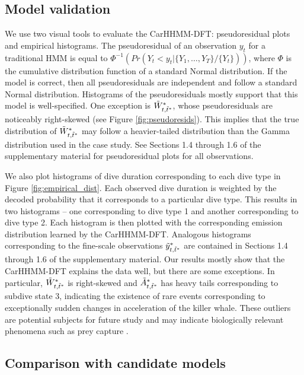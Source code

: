 \subsection{Model validation}
\label{subsec:model_validation}

We use two visual tools to evaluate the CarHHMM-DFT: pseudoresidual plots and empirical histograms. The pseudoresidual of an observation $y_t$ for a traditional HMM is equal to $\Phi^{-1} \left(Pr(Y_t < y_t|\{Y_1,\ldots,Y_T\}/\{Y_t\}) \right)$, where $\Phi$ is the cumulative distribution function of a standard Normal distribution. If the model is correct, then all pseudoresiduals are independent and follow a standard Normal distribution. Histograms of the pseudoresiduals mostly support that this model is well-specified. One exception is $\tilde{W}^*_{t,\tilde t^*}$, whose pseudoresiduals are noticeably right-skewed (see Figure \ref{fig:pseudoresids}). This implies that the true distribution of $\tilde{W}^*_{t,\tilde t^*}$ may follow a heavier-tailed distribution than the Gamma distribution used in the case study. See Sections 1.4 through 1.6 of the supplementary material for pseudoresidual plots for all observations.

We also plot histograms of dive duration corresponding to each dive type in Figure \ref{fig:empirical_dist}. Each observed dive duration is weighted by the decoded probability that it corresponds to a particular dive type. This results in two histograms -- one corresponding to dive type 1 and another corresponding to dive type 2. Each histogram is then plotted with the corresponding emission distribution learned by the CarHHMM-DFT. Analogous histograms corresponding to the fine-scale observations $\tilde{y}^*_{t,\tilde t^*}$ are contained in Sections 1.4 through 1.6 of the supplementary material. Our results mostly show that the CarHHMM-DFT explains the data well, but there are some exceptions. In particular, $\tilde{W}^*_{t,\tilde t^*}$ is right-skewed and $\tilde{A}^*_{t,\tilde t^*}$ has heavy tails corresponding to subdive state 3, indicating the existence of rare events corresponding to exceptionally sudden changes in acceleration of the killer whale. These outliers are potential subjects for future study and may indicate biologically relevant phenomena such as prey capture \citep{Tennessen:2019a}.

\subsection{Comparison with candidate models}

